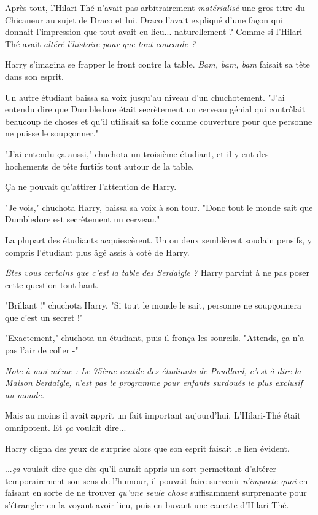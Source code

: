 Après tout, l'Hilari-Thé n'avait pas arbitrairement \emph{matérialisé}  une gros titre du Chicaneur au sujet de Draco et lui. Draco l'avait expliqué d'une façon qui donnait l'impression que tout avait eu lieu... naturellement ? Comme si l'Hilari-Thé avait \emph{altéré l'histoire pour que tout concorde ?} 

Harry s'imagina se frapper le front contre la table. \emph{Bam, bam, bam}  faisait sa tête dans son esprit.

Un autre étudiant baissa sa voix jusqu'au niveau d'un chuchotement. "J'ai entendu dire que Dumbledore était secrètement un cerveau génial qui contrôlait beaucoup de choses et qu'il utilisait sa folie comme couverture pour que personne ne puisse le soupçonner."

"J'ai entendu ça aussi," chuchota un troisième étudiant, et il y eut des hochements de tête furtifs tout autour de la table.

Ça ne pouvait qu'attirer l'attention de Harry.

"Je vois," chuchota Harry, baissa sa voix à son tour. "Donc tout le monde sait que Dumbledore est secrètement un cerveau."

La plupart des étudiants acquiescèrent. Un ou deux semblèrent soudain pensifs, y compris l'étudiant plus âgé assis à coté de Harry.

\emph{Êtes vous certains que c'est la table des Serdaigle ?}  Harry parvint à ne pas poser cette question tout haut.

"Brillant !" chuchota Harry. "Si tout le monde le sait, personne ne soupçonnera que c'est un secret !"

"Exactement," chuchota un étudiant, puis il fronça les sourcils. "Attends, ça n'a pas l'air de coller -"

\emph{Note à moi-même : Le 75ème centile des étudiants de Poudlard, c'est à dire la Maison Serdaigle, n'est pas le programme pour enfants surdoués le plus exclusif au monde.} 

Mais au moins il avait apprit un fait important aujourd'hui. L'Hilari-Thé était omnipotent. Et \emph{ça}  voulait dire...

Harry cligna des yeux de surprise alors que son esprit faisait le lien évident.

...\emph{ça}  voulait dire que dès qu'il aurait appris un sort permettant d'altérer temporairement son sens de l'humour, il pouvait faire survenir \emph{n'importe quoi}  en faisant en sorte de ne trouver \emph{qu'une seule chose}  suffisamment surprenante pour s'étrangler en la voyant avoir lieu, puis en buvant une canette d'Hilari-Thé.

